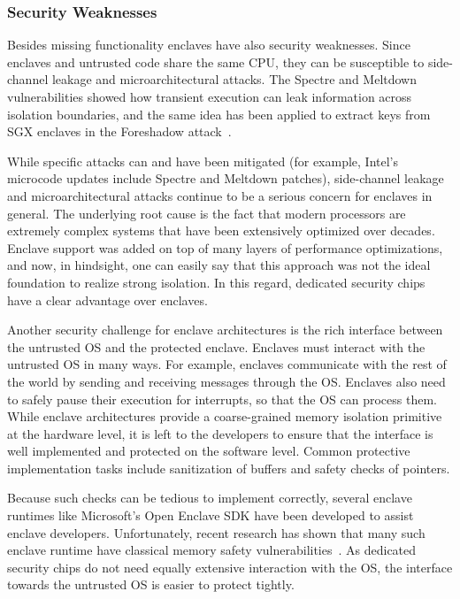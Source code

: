 \subsubsection*{Security Weaknesses}

Besides missing functionality enclaves have also security weaknesses. Since enclaves and untrusted code share the same CPU, they can be susceptible to side-channel leakage and microarchitectural attacks. The Spectre and Meltdown vulnerabilities showed how transient execution can leak information across isolation boundaries, and the same idea has been applied to extract keys from SGX enclaves in the Foreshadow attack~\cite{van2018foreshadow}. 

While specific attacks can and have been mitigated (for example, Intel’s microcode updates include Spectre and Meltdown patches), side-channel leakage and microarchitectural attacks continue to be a serious concern for enclaves in general. The underlying root cause is the fact that modern processors are extremely complex systems that have been extensively optimized over decades. Enclave support was added on top of many layers of performance optimizations, and now, in hindsight, one can easily say that this approach was not the ideal foundation to realize strong isolation. In this regard, dedicated security chips have a clear advantage over enclaves.

Another security challenge for enclave architectures is the rich interface between the untrusted OS and the protected enclave. Enclaves must interact with the untrusted OS in many ways. For example, enclaves communicate with the rest of the world by sending and receiving messages through the OS. Enclaves also need to safely pause their execution for interrupts, so that the OS can process them. While enclave architectures provide a coarse-grained memory isolation primitive at the hardware level, it is left to the developers to ensure that the interface is well implemented and protected on the software level. Common protective implementation tasks include sanitization of buffers and safety checks of pointers. 

Because such checks can be tedious to implement correctly, several enclave runtimes like Microsoft’s Open Enclave SDK have been developed to assist enclave developers. Unfortunately, recent research has shown that many such enclave runtime have classical memory safety vulnerabilities~\cite{van2019tale}. As dedicated security chips do not need equally extensive interaction with the OS, the interface towards the untrusted OS is easier to protect tightly. 



